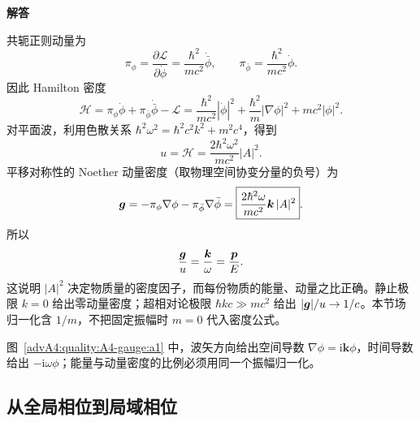 \begin{advsolution}
\begin{center}\begin{minipage}{.96\linewidth}\centering
\raggedright{\bfseries\color{DeepBlue}解答}\par\smallskip\centering

\label{advA4:quality:A4-gauge:a1}
\end{minipage}\end{center}

共轭正则动量为
\[
 \pi_\phi=\frac{\partial\mathcal L}{\partial\dot\phi}
 =\frac{\hbar^2}{mc^2}\dot{\bar\phi},
 \qquad
 \pi_{\bar\phi}=\frac{\hbar^2}{mc^2}\dot\phi.
\]
因此 Hamilton 密度
\[
 \mathcal H=\pi_\phi\dot\phi+\pi_{\bar\phi}\dot{\bar\phi}-\mathcal L
 =\frac{\hbar^2}{mc^2}|\dot\phi|^2
 +\frac{\hbar^2}{m}|\nabla\phi|^2+mc^2|\phi|^2.
\]
对平面波，利用色散关系
$\hbar^2\omega^2=\hbar^2c^2k^2+m^2c^4$，得到
\[
 \boxed{u=\mathcal H=\frac{2\hbar^2\omega^2}{mc^2}|A|^2}.
\]
平移对称性的 Noether 动量密度（取物理空间协变分量的负号）为
\[
 \bm{g}=-\pi_\phi\nabla\phi-\pi_{\bar\phi}\nabla\bar\phi
 =\boxed{\frac{2\hbar^2\omega}{mc^2}\bm{k}\,|A|^2}.
\]
所以
\[
 \frac{\bm{g}}{u}=\frac{\bm{k}}{\omega}
 =\frac{\bm{p}}{E}.
\]
这说明 $|A|^2$ 决定物质量的密度因子，而每份物质的能量、动量之比正确。静止极限 $k=0$ 给出零动量密度；超相对论极限 $\hbar kc\gg mc^2$ 给出 $|\bm{g}|/u\to1/c$。本节场归一化含 $1/m$，不把固定振幅时 $m=0$ 代入密度公式。

图~\ref{advA4:quality:A4-gauge:a1} 中，波矢方向给出空间导数 $\nabla\phi=\mathrm i\boldsymbol k\phi$，时间导数给出 $-\mathrm i\omega\phi$；能量与动量密度的比例必须用同一个振幅归一化。
\end{advsolution}

\subsection{从全局相位到局域相位}

